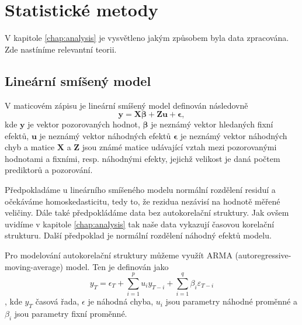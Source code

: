 \section{Statistické metody}\label{chap:statistika}
V kapitole \ref{chap:analysis} je vysvětleno jakým způsobem byla data zpracována. Zde nastíníme relevantní teorii.

\subsection{Lineární smíšený model}
V maticovém zápisu je lineární smíšený model definován následovně\cite{mcleanrobert1991}
$$\boldsymbol{y} = \boldsymbol{X}\boldsymbol{\beta} + \boldsymbol{Z}\boldsymbol{u} + \boldsymbol{\epsilon},$$ \label{eq:linearmixedeffectmodel}
kde $\mathbf{y}$ je vektor pozorovaných hodnot, $\mathbf{\beta}$ je neznámý vektor hledaných fixní efektů, $\mathbf{u}$ je neznámý vektor náhodných efektů $\mathbf{\epsilon}$ je neznámý vektor náhodných chyb a matice $\mathbf{X}$ a $\mathbf{Z}$ jsou známé matice udávající vztah mezi pozorovanými hodnotami a fixními, resp. náhodnými efekty, jejichž velikost je daná počtem prediktorů a pozorování\cite{mcleanrobert1991}.

Předpokladáme u lineárního smíšeného modelu normální rozdělení residuí a očekáváme homoskedasticitu, tedy to, že rezidua nezávisí na hodnotě měřené veličiny. Dále také předpokládáme data bez autokorelační struktury. Jak ovšem uvidíme v kapitole \ref{chap:analysis} tak naše data vykazují časovou korelační strukturu. Další předpoklad je normální rozdělení náhodný efektů modelu\cite{hefleytrevorj2017}. 

Pro modelování autokorelační struktury můžeme využít ARMA (autoregressive-moving-average) model. Ten je definován jako\cite{wilsongranville2016}
$$y_T = \epsilon_T + \sum_{i=1}^{p}u_i y_{T-i} + \sum_{i=1}^{q}\beta_i\varepsilon_{T-i}$$,
kde $y_T$ časová řada, $\epsilon$ je náhodná chyba, $u_i$ jsou parametry náhodné proměnné a $\beta_i$ jsou parametry fixní proměnné. 
